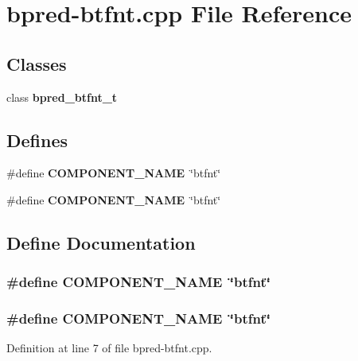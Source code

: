 \section{bpred-btfnt.cpp File Reference}
\label{bpred-btfnt_8cpp}
\subsection*{Classes}
\begin{CompactItemize}
\item 
class {\bf bpred\_\-btfnt\_\-t}
\end{CompactItemize}
\subsection*{Defines}
\begin{CompactItemize}
\item 
\#define {\bf COMPONENT\_\-NAME}~\char`\"{}btfnt\char`\"{}
\item 
\#define {\bf COMPONENT\_\-NAME}~\char`\"{}btfnt\char`\"{}
\end{CompactItemize}


\subsection{Define Documentation}
\subsubsection[{COMPONENT\_\-NAME}]{\setlength{\rightskip}{0pt plus 5cm}\#define COMPONENT\_\-NAME~\char`\"{}btfnt\char`\"{}}\label{zesto-bpred_8cpp_9146ade7ce24e3db226a973a59063892}


\subsubsection[{COMPONENT\_\-NAME}]{\setlength{\rightskip}{0pt plus 5cm}\#define COMPONENT\_\-NAME~\char`\"{}btfnt\char`\"{}}\label{bpred-btfnt_8cpp_9146ade7ce24e3db226a973a59063892}




Definition at line 7 of file bpred-btfnt.cpp.